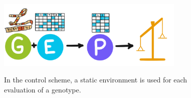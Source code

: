 \begin{figure}
    \centering
    \includegraphics[width=0.8\textwidth]{img/modelscheme} \\
    \caption{In the control scheme, a static environment is used for each evaluation of a genotype.}
     \label{fig:control_scheme}
\end{figure}